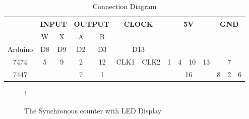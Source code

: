 \documentclass[journal,12pt,twocolumn]{IEEEtran}
\begin{document}
\begin{enumerate}[1.]
\begin{table}[h!]
	\begin{center}
		\begin{tabular}{ |c|c|c|c|c|c|c|c|c|c|c|c|c|c| } 
			\hline
			\multicolumn{1}{|c|}{} &\multicolumn{2}{|c|}{\textbf{INPUT}} & \multicolumn{2}{|c|}{\textbf{OUTPUT}} &\multicolumn{2}{|c|}{\textbf{CLOCK}} &\multicolumn{4}{|c|}{\textbf{5V}} &\multicolumn{3}{|c|}{\textbf{GND}}\\
			\hline
			\multicolumn{1}{|c|}{} & \multicolumn{1}{|c|}{W} & \multicolumn{1}{|c|}{X} & \multicolumn{1}{|c|}{A} & \multicolumn{1}{|c|}{B} & \multicolumn{2}{|c|}{} & \multicolumn{4}{|c|}{} & \multicolumn{3}{|c|}{}   \\
			\hline
			\multicolumn{1}{|c|}{Arduino} & \multicolumn{1}{|c|}{D8} & \multicolumn{1}{|c|}{D9} & \multicolumn{1}{|c|}{D2} & \multicolumn{1}{|c|}{D3} & \multicolumn{2}{|c|}{D13} & \multicolumn{4}{|c|}{} & \multicolumn{3}{|c|}{}\\
			\hline
			\multicolumn{1}{|c|}{7474} & \multicolumn{1}{|c|}{5} & \multicolumn{1}{|c|}{9} & \multicolumn{1}{|c|}{2} & \multicolumn{1}{|c|}{12} & \multicolumn{1}{|c|}{CLK1} & \multicolumn{1}{|c|}{CLK2} & \multicolumn{1}{|c|}{1} & \multicolumn{1}{|c|}{4} & \multicolumn{1}{|c|}{10} & \multicolumn{1}{|c|}{13} & \multicolumn{3}{|c|}{7} \\
			\hline
			\multicolumn{1}{|c|}{7447} & \multicolumn{2}{|c|}{} & \multicolumn{1}{|c|}{7} & \multicolumn{1}{|c|}{1} & \multicolumn{2}{|c|}{} & \multicolumn{4}{|c|}{16} & \multicolumn{1}{|c|}{8} & \multicolumn{1}{|c|}{2} & \multicolumn{1}{|c|}{6}\\
			\hline
		\end{tabular}
		\caption{Connection Diagram}
		\label{table:Connection_table}
	\end{center}
\end{table}

\begin{figure}[!h]
\resizebox {\columnwidth} {!} {
  
}

\caption{The Synchronous counter with LED Display}
\label{fig:dec_counter}
\end{figure}




\end{enumerate}



	
	
	
%		

\end{document}
